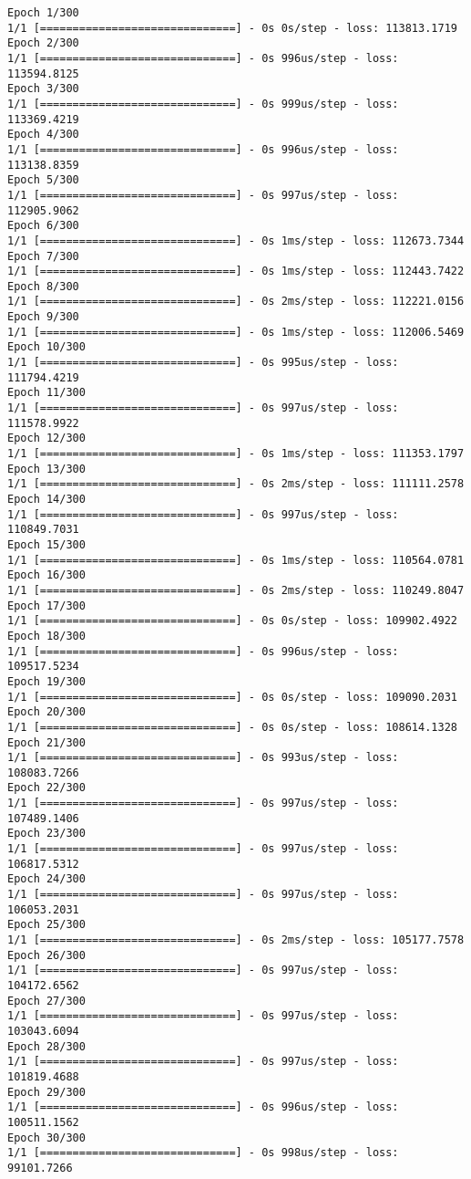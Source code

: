 \documentclass[11pt]{article}
\begin{document}
    \begin{Verbatim}[commandchars=\\\{\}]
Epoch 1/300
1/1 [==============================] - 0s 0s/step - loss: 113813.1719
Epoch 2/300
1/1 [==============================] - 0s 996us/step - loss: 113594.8125
Epoch 3/300
1/1 [==============================] - 0s 999us/step - loss: 113369.4219
Epoch 4/300
1/1 [==============================] - 0s 996us/step - loss: 113138.8359
Epoch 5/300
1/1 [==============================] - 0s 997us/step - loss: 112905.9062
Epoch 6/300
1/1 [==============================] - 0s 1ms/step - loss: 112673.7344
Epoch 7/300
1/1 [==============================] - 0s 1ms/step - loss: 112443.7422
Epoch 8/300
1/1 [==============================] - 0s 2ms/step - loss: 112221.0156
Epoch 9/300
1/1 [==============================] - 0s 1ms/step - loss: 112006.5469
Epoch 10/300
1/1 [==============================] - 0s 995us/step - loss: 111794.4219
Epoch 11/300
1/1 [==============================] - 0s 997us/step - loss: 111578.9922
Epoch 12/300
1/1 [==============================] - 0s 1ms/step - loss: 111353.1797
Epoch 13/300
1/1 [==============================] - 0s 2ms/step - loss: 111111.2578
Epoch 14/300
1/1 [==============================] - 0s 997us/step - loss: 110849.7031
Epoch 15/300
1/1 [==============================] - 0s 1ms/step - loss: 110564.0781
Epoch 16/300
1/1 [==============================] - 0s 2ms/step - loss: 110249.8047
Epoch 17/300
1/1 [==============================] - 0s 0s/step - loss: 109902.4922
Epoch 18/300
1/1 [==============================] - 0s 996us/step - loss: 109517.5234
Epoch 19/300
1/1 [==============================] - 0s 0s/step - loss: 109090.2031
Epoch 20/300
1/1 [==============================] - 0s 0s/step - loss: 108614.1328
Epoch 21/300
1/1 [==============================] - 0s 993us/step - loss: 108083.7266
Epoch 22/300
1/1 [==============================] - 0s 997us/step - loss: 107489.1406
Epoch 23/300
1/1 [==============================] - 0s 997us/step - loss: 106817.5312
Epoch 24/300
1/1 [==============================] - 0s 997us/step - loss: 106053.2031
Epoch 25/300
1/1 [==============================] - 0s 2ms/step - loss: 105177.7578
Epoch 26/300
1/1 [==============================] - 0s 997us/step - loss: 104172.6562
Epoch 27/300
1/1 [==============================] - 0s 997us/step - loss: 103043.6094
Epoch 28/300
1/1 [==============================] - 0s 997us/step - loss: 101819.4688
Epoch 29/300
1/1 [==============================] - 0s 996us/step - loss: 100511.1562
Epoch 30/300
1/1 [==============================] - 0s 998us/step - loss: 99101.7266

\end{Verbatim}
\end{document}
